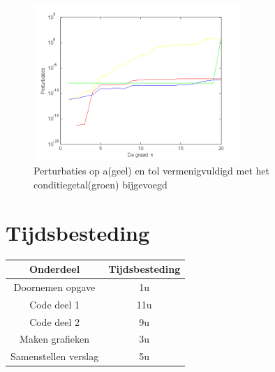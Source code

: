 \documentclass[11pt,a4paper]{article}
\begin{document}
\begin{figure}[H]
	\centering
	\includegraphics[width=0.7\textwidth]{22i1.png}
	\caption*{Perturbaties op a(geel) en tol vermenigvuldigd met het conditiegetal(groen) bijgevoegd}
	\end{figure}
	
\section{Tijdsbesteding}
\begin{center}
\begin{tabular}{ c || c }
Onderdeel & Tijdsbesteding\\
\hline
\hline
Doornemen opgave & 1u\\
\hline
Code deel 1 & 11u\\
\hline
Code deel 2 & 9u\\
\hline
Maken grafieken & 3u\\
\hline
Samenstellen verslag & 5u
\end{tabular}
\end{center}
\end{document}
